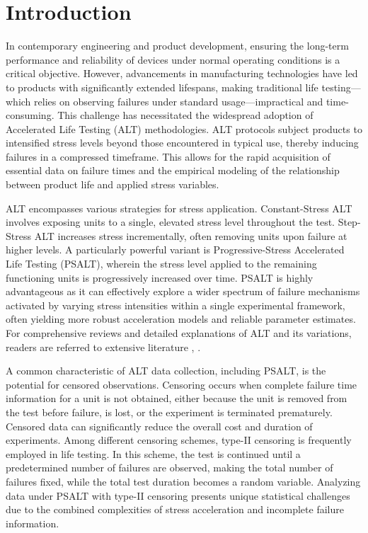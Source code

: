 \documentclass[twoside]{article}
\begin{document}
\section{Introduction}
In contemporary engineering and product development, ensuring the long-term performance and reliability of devices under normal operating conditions is a critical objective. However, advancements in manufacturing technologies have led to products with significantly extended lifespans, making traditional life testing—which relies on observing failures under standard usage—impractical and time-consuming. This challenge has necessitated the widespread adoption of Accelerated Life Testing (ALT) methodologies. ALT protocols subject products to intensified stress levels beyond those encountered in typical use, thereby inducing failures in a compressed timeframe. This allows for the rapid acquisition of essential data on failure times and the empirical modeling of the relationship between product life and applied stress variables.

ALT encompasses various strategies for stress application. Constant-Stress ALT involves exposing units to a single, elevated stress level throughout the test. Step-Stress ALT increases stress incrementally, often removing units upon failure at higher levels. A particularly powerful variant is Progressive-Stress Accelerated Life Testing (PSALT), wherein the stress level applied to the remaining functioning units is progressively increased over time. PSALT is highly advantageous as it can effectively explore a wider spectrum of failure mechanisms activated by varying stress intensities within a single experimental framework, often yielding more robust acceleration models and reliable parameter estimates. For comprehensive reviews and detailed explanations of ALT and its variations, readers are referred to extensive literature \cite{Nooshin2018}, \cite{Nooshin2021}.

A common characteristic of ALT data collection, including PSALT, is the potential for censored observations. Censoring occurs when complete failure time information for a unit is not obtained, either because the unit is removed from the test before failure, is lost, or the experiment is terminated prematurely. Censored data can significantly reduce the overall cost and duration of experiments. Among different censoring schemes, type-II censoring is frequently employed in life testing. In this scheme, the test is continued until a predetermined number of failures are observed, making the total number of failures fixed, while the total test duration becomes a random variable. Analyzing data under PSALT with type-II censoring presents unique statistical challenges due to the combined complexities of stress acceleration and incomplete failure information.
\end{document}
